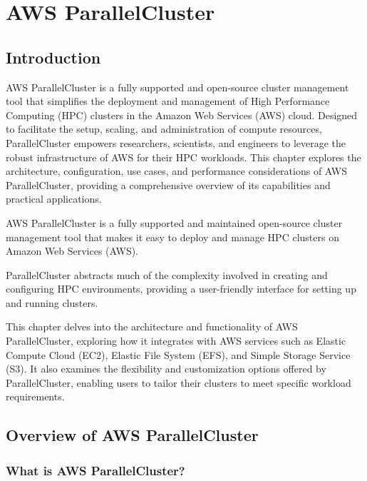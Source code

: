 

\chapter{AWS ParallelCluster}

\section{Introduction}

AWS ParallelCluster is a fully supported and open-source cluster management tool that simplifies the deployment and management of High Performance Computing (HPC) clusters in the Amazon Web Services (AWS) cloud. Designed to facilitate the setup, scaling, and administration of compute resources, ParallelCluster empowers researchers, scientists, and engineers to leverage the robust infrastructure of AWS for their HPC workloads. This chapter explores the architecture, configuration, use cases, and performance considerations of AWS ParallelCluster, providing a comprehensive overview of its capabilities and practical applications.

AWS ParallelCluster is a fully supported and maintained open-source cluster management tool that makes it easy to deploy and manage HPC clusters on Amazon Web Services (AWS). 

ParallelCluster abstracts much of the complexity involved in creating and configuring HPC environments, providing a user-friendly interface for setting up and running clusters.

This chapter delves into the architecture and functionality of AWS ParallelCluster, exploring how it integrates with AWS services such as Elastic Compute Cloud (EC2), Elastic File System (EFS), and Simple Storage Service (S3). It also examines the flexibility and customization options offered by ParallelCluster, enabling users to tailor their clusters to meet specific workload requirements.

\section{Overview of AWS ParallelCluster}

\subsection{What is AWS ParallelCluster?}

